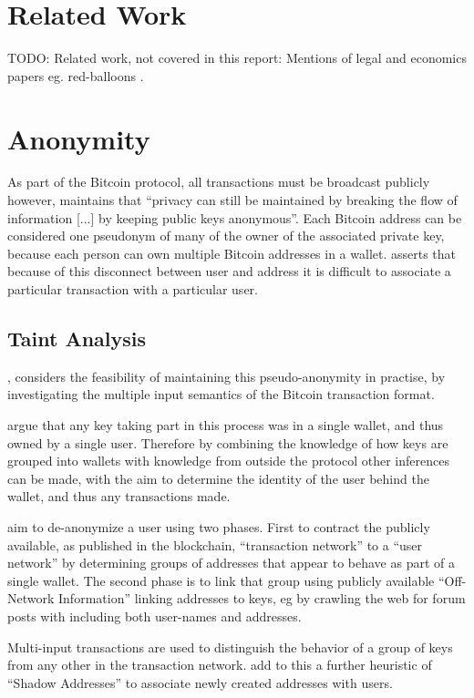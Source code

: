 \section{Related Work}
TODO: Related work, not covered in this report: Mentions of legal and economics papers eg. red-balloons \cite{red-balloons}.


\section{Anonymity}
As part of the Bitcoin protocol, all transactions must be broadcast publicly however, \textcite{satoshi} maintains that ``privacy can still be maintained by breaking the flow of information [...] by keeping public keys anonymous''.  Each Bitcoin address can be considered one pseudonym of many of the owner of the associated private key, because each person can own multiple Bitcoin addresses in a wallet. \textcite{satoshi} asserts that because of this disconnect between user and address it is difficult to associate a particular transaction with a particular user.


\subsection{Taint Analysis} \textcite{reid-anon}, considers the feasibility of maintaining this pseudo-anonymity in practise, by investigating the multiple input semantics of the Bitcoin transaction format. 


\textcite{reid-anon} argue that any key taking part in this process was in a single wallet, and thus owned by a single user. Therefore by combining the knowledge of how keys are grouped into wallets with knowledge from outside the protocol other inferences can be made, with the aim to determine the identity of the user behind the wallet, and thus any transactions made.


\textcite{reid-anon} aim to de-anonymize a user using two phases.  First to contract the publicly available, as published in the blockchain, ``transaction network'' to a ``user network'' by determining groups of addresses that appear to behave as part of a single wallet.  The second phase is to  link that group using publicly available ``Off-Network Information'' linking addresses to keys, eg by crawling the web for forum posts with including both user-names and addresses.

Multi-input transactions are used to distinguish the behavior of a group of keys from any other in the transaction network.  \textcite{eval-priv} add to this a further heuristic of ``Shadow Addresses'' to associate newly created addresses with users.

